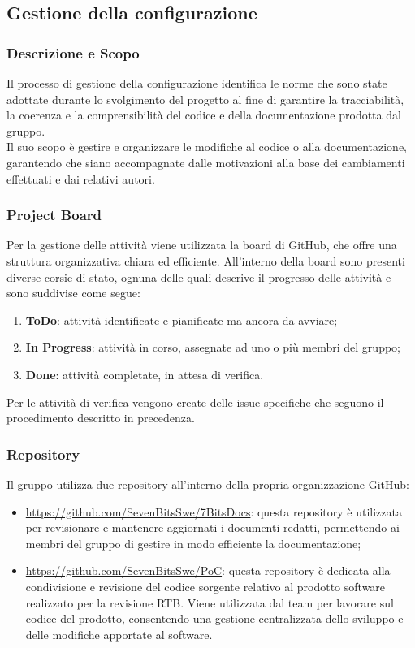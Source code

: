 \documentclass[10pt]{article}
\begin{document}
\begin{justify}
    \subsection{Gestione della configurazione}
    \label{gestione-configurazione}
    \subsubsection{Descrizione e Scopo}
    Il processo di gestione della configurazione identifica le norme che sono state adottate durante lo svolgimento del progetto al fine di garantire la tracciabilità, la coerenza e la comprensibilità del codice e della documentazione prodotta dal gruppo.\\
    Il suo scopo è gestire e organizzare le modifiche al codice o alla documentazione, garantendo che siano accompagnate dalle motivazioni alla base dei cambiamenti effettuati e dai relativi autori.

    \subsubsection{Project Board}
    Per la gestione delle attività viene utilizzata la board di GitHub, che offre una struttura organizzativa chiara ed efficiente. All'interno della board sono presenti diverse corsie di stato, ognuna delle quali descrive il progresso delle attività e sono suddivise come segue:
    \begin{enumerate}
        \item \textbf{ToDo}: attività identificate e pianificate ma ancora da avviare;
        \item \textbf{In Progress}: attività in corso, assegnate ad uno o più membri del gruppo;
        \item \textbf{Done}: attività completate, in attesa di verifica.
    \end{enumerate}
    Per le attività di verifica vengono create delle issue specifiche che seguono il procedimento descritto in precedenza.

    \subsubsection{Repository}
    Il gruppo utilizza due repository all'interno della propria organizzazione GitHub:
    \begin{itemize}
        \item \href{https://github.com/SevenBitsSwe/7BitsDocs}{https://github.com/SevenBitsSwe/7BitsDocs}: questa repository è utilizzata per revisionare e mantenere aggiornati i documenti redatti, permettendo ai membri del gruppo di gestire in modo efficiente la documentazione;
        \item \href{https://github.com/SevenBitsSwe/PoC}{https://github.com/SevenBitsSwe/PoC}: questa repository è dedicata alla condivisione e revisione del codice sorgente relativo al prodotto software realizzato per la revisione RTB. Viene utilizzata dal team per lavorare sul codice del prodotto, consentendo una gestione centralizzata dello sviluppo e delle modifiche apportate al software.
    \end{itemize}


\end{justify}
\end{document}

